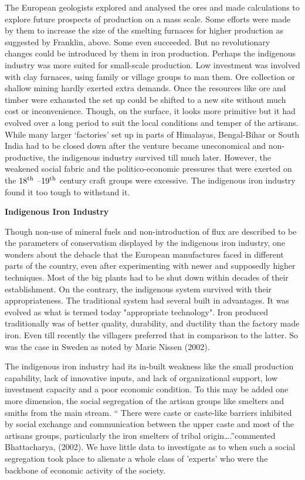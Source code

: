 The European geologists explored and analysed the ores and made calculations to explore future prospects of production on a mass scale. Some efforts were made by them to increase the size of the smelting furnaces for higher production as suggested by Franklin, above. Some even succeeded. But no revolutionary changes could be introduced by them in iron production. Perhaps the indigenous industry was more suited for small-scale production. Low investment was involved with clay furnaces, using family or village groups to man them. Ore collection or shallow mining hardly exerted extra demands. Once the resources like ore and timber were exhausted the set up could be shifted to a new site without much cost or inconvenience. Though, on the surface, it looks more primitive but it had evolved over a long period to suit the local conditions and temper of the artisans. While many larger ‘factories’ set up in parts of Himalayas, Bengal-Bihar or South India had to be closed down after the venture became uneconomical and non-productive, the indigenous industry survived till much later. However, the weakened social fabric and the politico-economic pressures that were exerted on the $18^{\rm th}$ –$19^{\rm th}$ century craft groups were excessive.  The indigenous iron industry found it too tough to withstand it. 

\noindent \textbf{\large Indigenous Iron Industry}

Though non-use of mineral fuels and non-introduction of flux are described to be the parameters of conservatism displayed by the indigenous iron industry, one wonders about the debacle that the European manufactures faced in different parts of the country, even after experimenting with newer and supposedly higher techniques. Most of the big plants had to be shut down within decades of their establishment. On the contrary, the indigenous system survived with their appropriateness. The traditional system had several built in advantages. It was evolved as what is termed today "appropriate technology". Iron produced traditionally was of better quality, durability, and ductility than the factory made iron. Even till recently the villagers preferred that in comparison to the latter. So was the case in Sweden as noted by Marie Nissen (2002).

The indigenous iron industry had its in-built weakness like the small production capability, lack of innovative inputs, and lack of organizational support, low investment capacity and a poor economic condition. To this may be added one more dimension, the social segregation of the artisan groups like smelters and smiths from the main stream. “ There were caste or caste-like barriers inhibited by social exchange and communication between the upper caste and most of the artisans groups, particularly the iron smelters of tribal origin….”commented Bhattacharya, (2002). We have little data to investigate as to when such a social segregation took place to alienate a whole class of 'experts' who were the backbone of economic activity of the society. 

